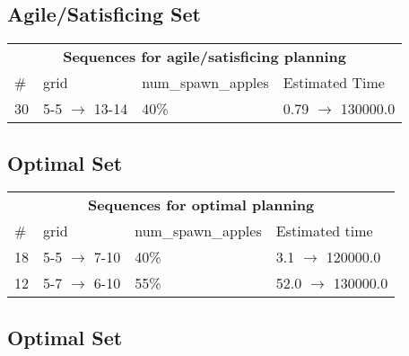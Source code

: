 \documentclass{article}
\begin{document}
                         \subsection*{Agile/Satisficing Set}

                        \begin{center}
                        \begin{tabular}{l|l|l|l}
                        \multicolumn{4}{c}{\bf \large Sequences for agile/satisficing planning}\\
                        \# & grid & num\_spawn\_apples & Estimated Time\\\midrule
                        30&5-5 $\rightarrow$ 13-14&40\%&0.79 $\rightarrow$ 130000.0
                        \end{tabular}
                        \end{center}
                    
                            \subsection*{Optimal Set}

                            \begin{center}
                            \begin{tabular}{l|l|l|l}
                            \multicolumn{4}{c}{\bf \large Sequences for optimal planning}\\
                            \# & grid & num\_spawn\_apples & Estimated time\\\midrule
                            18&5-5 $\rightarrow$ 7-10&40\%&3.1 $\rightarrow$ 120000.0\\
12&5-7 $\rightarrow$ 6-10&55\%&52.0 $\rightarrow$ 130000.0
                            \end{tabular}
                            \end{center}
                    
                                \subsection*{Optimal Set}
                                
\end{document}
